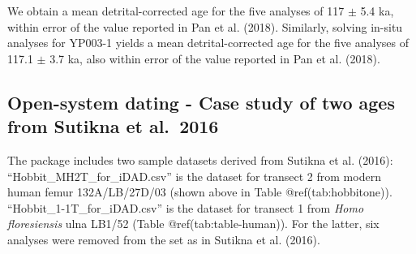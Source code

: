 \documentclass[]{elsarticle} %
\begin{document}
We obtain a mean detrital-corrected age for the five analyses of 117 \(\pm\) 5.4 ka, within error of the value reported in Pan et al. (2018).
Similarly, solving in-situ analyses for YP003-1 yields a mean detrital-corrected age for the five analyses of 117.1 \(\pm\) 3.7 ka, also within error of the value reported in Pan et al. (2018).

\hypertarget{open-system-dating---case-study-of-two-ages-from-sutikna-et-al.-2016}{%
\subsection{Open-system dating - Case study of two ages from Sutikna et al.~2016}\label{open-system-dating---case-study-of-two-ages-from-sutikna-et-al.-2016}}

The package includes two sample datasets derived from Sutikna et al. (2016): ``Hobbit\_MH2T\_for\_iDAD.csv'' is the dataset for transect 2 from modern human femur 132A/LB/27D/03 (shown above in Table @ref(tab:hobbitone)). ``Hobbit\_1-1T\_for\_iDAD.csv'' is the dataset for transect 1 from \emph{Homo floresiensis} ulna LB1/52 (Table @ref(tab:table-human)). For the latter, six analyses were removed from the set as in Sutikna et al. (2016).
\end{document}

